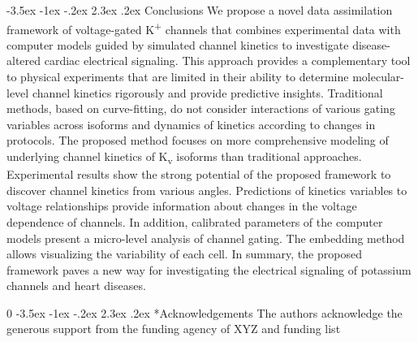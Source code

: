 \documentclass[11pt]{article}
\makeatletter
\newcommand{\blind}{0}
\renewcommand\section{\@startsection {section}{1}{\z@}%
                                   {-3.5ex \@plus -1ex \@minus -.2ex}%
                                   {2.3ex \@plus.2ex}%
                                   {\normalfont\fontfamily{phv}\fontsize{16}{19}\bfseries}}
\makeatother
\begin{document}
\section{Conclusions}\label{s:conclusions}
We propose a novel data assimilation framework of voltage-gated K\textsuperscript{+} channels that combines experimental data with computer models guided by simulated channel kinetics to investigate disease-altered cardiac electrical signaling. This approach provides a complementary tool to physical experiments that are limited in their ability to determine molecular-level channel kinetics rigorously and provide predictive insights. Traditional methods, based on curve-fitting, do not consider interactions of various gating variables across isoforms and dynamics of kinetics according to changes in protocols. The proposed method focuses on more comprehensive modeling of underlying channel kinetics of K\textsubscript{v} isoforms than traditional approaches. Experimental results show the strong potential of the proposed framework to discover channel kinetics from various angles. Predictions of kinetics variables to voltage relationships provide information about changes in the voltage dependence of channels. In addition, calibrated parameters of the computer models present a micro-level analysis of channel gating. The embedding method allows visualizing the variability of each cell. In summary, the proposed framework paves a new way for investigating the electrical signaling of potassium channels and heart diseases. 

\blind{
\section*{Acknowledgements}
The authors acknowledge the generous support from the funding agency of XYZ and funding list} \fi



	
\end{document}
